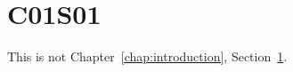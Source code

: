 \section{C01S01}\label{sec:chapter01section01}

This is not Chapter~\ref{chap:introduction}, Section~\ref{sec:chapter01section01}.